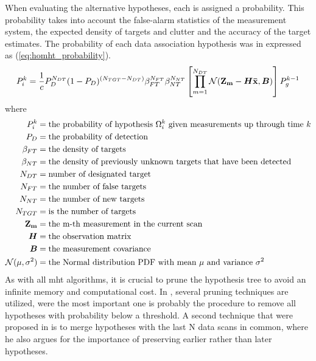 When evaluating the alternative hypotheses, each is assigned a probability. This probability takes into account the false-alarm statistics of the measurement system, the expected density of \glspl{target} and clutter and the accuracy of the \gls{target} estimates. The probability of each data association hypothesis was in \cite{Reid1979} expressed as (\ref{eq:homht_probability}).
\begin{equation}
P_i^k = \frac{1}{c} P_D^{N_{DT}}(1-P_D)^{(N_{TGT}-N_{DT})} \beta_{FT}^{N_{FT}} \beta_{NT}^{N_{NT}} \left[ \prod_{m=1}^{N_{DT}} \mathcal{N}(\boldsymbol{\mathbf{Z_m}}-\bm{H}\boldsymbol{\mathbf{\bar{x}}},\bm{B}) \right] P_g^{k-1}
\label{eq:homht_probability}
\end{equation}
where 
\begin{equation*}
\begin{split}
	P_i^k		&= \text{the probability of hypothesis $\Omega_i^k$ given measurements up through time $k$} \\
	P_D 		&= \text{the probability of detection} \\
	\beta_{FT} 	&= \text{the density of targets} \\ 
	\beta_{NT}	&= \text{the density of previously unknown targets that have been detected} \\
	N_{DT} 		&=	\text{number of designated target} \\
	N_{FT} 		&= \text{the number of false targets} \\
	N_{NT} 		&= \text{the number of new targets} \\
	N_{TGT} 	&= \text{is the number of targets} \\
	\boldsymbol{\mathbf{Z_m}} 	&= \text{the m-th measurement in the current scan} \\
	\bm{H} 		&= \text{the observation matrix} \\
	\bm{B} 		&= \text{the measurement covariance} \\
	\mathcal{N}(\mu,\sigma^2) &= \text{the Normal distribution PDF with mean $\mu$ and variance $\sigma^2$}
\end{split}
\end{equation*}
As with all \gls{mht} algorithms, it is crucial to prune the hypothesis tree to avoid an infinite memory and computational cost. In \cite{Reid1979}, several pruning techniques are utilized, were the most important one is probably the procedure to remove all hypotheses with probability below a threshold. A second technique that were proposed in \cite{Reid1979} is to merge hypotheses with the last N data scans in common, where he also argues for the importance of preserving earlier rather than later hypotheses. 

